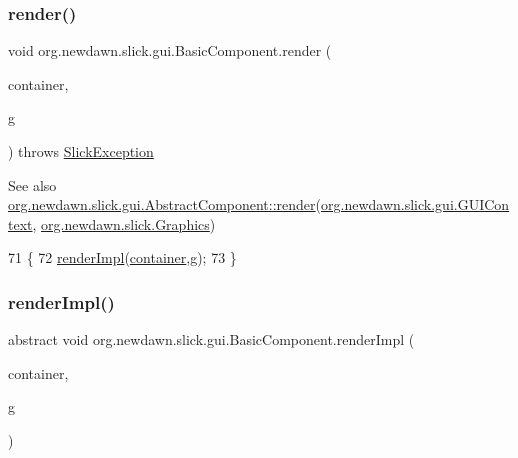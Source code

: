\subsubsection{\texorpdfstring{render()}{render()}}
{\footnotesize\ttfamily void org.\+newdawn.\+slick.\+gui.\+Basic\+Component.\+render (\begin{DoxyParamCaption}\item[{\mbox{\hyperlink{interfaceorg_1_1newdawn_1_1slick_1_1gui_1_1_g_u_i_context}{G\+U\+I\+Context}}}]{container,  }\item[{\mbox{\hyperlink{classorg_1_1newdawn_1_1slick_1_1_graphics}{Graphics}}}]{g }\end{DoxyParamCaption}) throws \mbox{\hyperlink{classorg_1_1newdawn_1_1slick_1_1_slick_exception}{Slick\+Exception}}\hspace{0.3cm}{\ttfamily [inline]}}

\begin{DoxySeeAlso}{See also}
\mbox{\hyperlink{classorg_1_1newdawn_1_1slick_1_1gui_1_1_abstract_component_af2f66829fb28f1c9f27acfc6f1be2445}{org.\+newdawn.\+slick.\+gui.\+Abstract\+Component\+::render}}(\mbox{\hyperlink{interfaceorg_1_1newdawn_1_1slick_1_1gui_1_1_g_u_i_context}{org.\+newdawn.\+slick.\+gui.\+G\+U\+I\+Context}}, \mbox{\hyperlink{classorg_1_1newdawn_1_1slick_1_1_graphics}{org.\+newdawn.\+slick.\+Graphics}}) 
\end{DoxySeeAlso}

\begin{DoxyCode}
71                                                                                \{
72         \mbox{\hyperlink{classorg_1_1newdawn_1_1slick_1_1gui_1_1_basic_component_ab10fd53ca7161571aadbb65ab21fa8d8}{renderImpl}}(\mbox{\hyperlink{classorg_1_1newdawn_1_1slick_1_1gui_1_1_abstract_component_af6d1abaa24da0b9a06fb153722e15435}{container}},g);
73     \}
\end{DoxyCode}
\mbox{\label{classorg_1_1newdawn_1_1slick_1_1gui_1_1_basic_component_ab10fd53ca7161571aadbb65ab21fa8d8}} 
\subsubsection{\texorpdfstring{render\+Impl()}{renderImpl()}}
{\footnotesize\ttfamily abstract void org.\+newdawn.\+slick.\+gui.\+Basic\+Component.\+render\+Impl (\begin{DoxyParamCaption}\item[{\mbox{\hyperlink{interfaceorg_1_1newdawn_1_1slick_1_1gui_1_1_g_u_i_context}{G\+U\+I\+Context}}}]{container,  }\item[{\mbox{\hyperlink{classorg_1_1newdawn_1_1slick_1_1_graphics}{Graphics}}}]{g }\end{DoxyParamCaption})\hspace{0.3cm}{\ttfamily [abstract]}}

